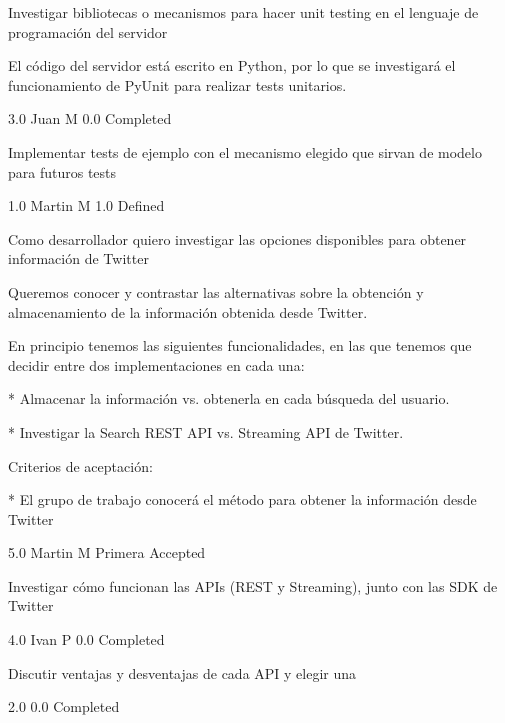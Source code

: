 		{Investigar bibliotecas o mecanismos para hacer unit testing en el lenguaje de programación del servidor} %
		{El código del servidor está escrito en Python, por lo que se investigará el
funcionamiento de PyUnit para realizar tests unitarios.

} %
		{3.0} %
		{Juan M} %
		{0.0} %
		{Completed} %

		{Implementar tests de ejemplo con el mecanismo elegido que sirvan de modelo para futuros tests} %
		{

} %
		{1.0} %
		{Martin M} %
		{1.0} %
		{Defined} %


\vspace{20pt}

	{Como desarrollador quiero investigar las opciones disponibles para obtener información de Twitter} %
	{Queremos conocer y contrastar las alternativas sobre la obtención y
almacenamiento de la información obtenida desde Twitter.

  
En principio tenemos las siguientes funcionalidades, en las que tenemos que
decidir entre dos implementaciones en cada una:

* Almacenar la información vs. obtenerla en cada búsqueda del usuario.

* Investigar la Search REST API vs. Streaming API de Twitter.

  

Criterios de aceptación:

* El grupo de trabajo conocerá el método para obtener la información desde Twitter  

} %
	{} %
	{5.0} %
	{Martin M} %
	{Primera} %
	{Accepted} %

		{Investigar cómo funcionan las APIs (REST y Streaming), junto con las SDK de Twitter} %
		{

} %
		{4.0} %
		{Ivan P} %
		{0.0} %
		{Completed} %

		{Discutir ventajas y desventajas de cada API y elegir una} %
		{

} %
		{2.0} %
		{} %
		{0.0} %
		{Completed} %

